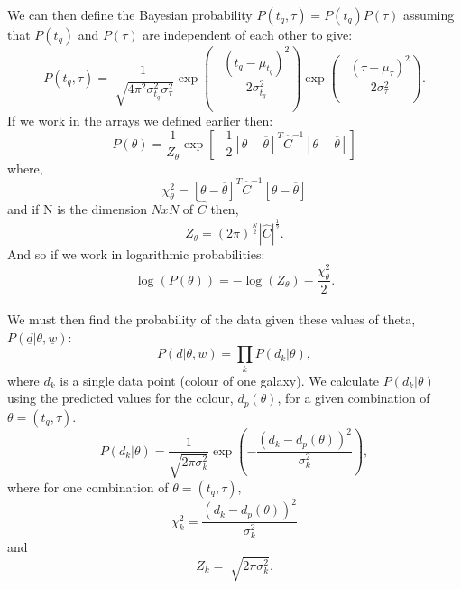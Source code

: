 \documentclass[a4paper, twoside, 12pt]{article}
\begin{document}
We can then define the Bayesian probability $P(t_{q}, \tau) = P(t_{q})P(\tau)$ assuming that $ P(t_{q})$ and $P(\tau)$ are independent of each other to give:
\begin{equation*}
P(t_{q}, \tau) = \frac{1}{\sqrt[]{4\pi^2\sigma^2_{t_{q}}\sigma^2_{\tau}}} \exp\left(-\frac{(t_{q}-\mu_{t_{q}})^2}{2\sigma^2_{t_{q}}}\right)\exp\left(-\frac{(\tau-\mu_{\tau})^2}{2\sigma^2_{\tau}}\right).
\end{equation*}
If we work in the arrays we defined earlier then:
\begin{equation*}
P(\theta) = \frac{1}{Z_{\theta}} \exp{\left[ -\frac{1}{2} [\theta - \overline{\theta}]^T \hat{C}^{-1} [\theta - \overline{\theta}] \right]}
\end{equation*}
where,
\begin{equation*}
\chi^2_{\theta} = [\theta - \overline{\theta}]^T \hat{C}^{-1} [\theta - \overline{\theta}]
\end{equation*}
and if N is the dimension $N x N$ of $\hat{C}$ then,
\begin{equation*}
Z_{\theta} = (2\pi)^{\frac{N}{2}} |\hat{C}|^{\frac{1}{2}}.
\end{equation*}
And so if we work in logarithmic probabilities:
\begin{equation*}
\log{(P(\theta))} = - \log{(Z_{\theta})} - \frac{\chi^2_{\theta}}{2}.
\end{equation*}
\\
We must then find the probability of the data given these values of theta, $P(\underline{d}|\theta, \underline{w})$:
\begin{equation*}
P(\underline{d}|\theta, \underline{w}) = \prod_{k} P(d_{k}|\theta),
\end{equation*}
where $d_{k}$ is a single data point (colour of one galaxy). We calculate $P(d_{k}|\theta)$ using the predicted values for the colour, $d_p(\theta)$, for a given combination of $\theta = (t_{q}, \tau)$. 
\begin{equation*}
P(d_{k}|\theta) = \frac{1}{\sqrt{2\pi\sigma_{k}^2}} \exp{\left( - \frac{(d_{k} - d_{p}(\theta))^2}{\sigma_{k}^2} \right)},
\end{equation*}
where for one combination of $\theta = (t_{q}, \tau)$,
\begin{equation*}
\chi_{k}^2 = \frac{(d_{k} - d_{p}(\theta))^2}{\sigma_{k}^2}
\end{equation*}
and
\begin{equation*}
Z_{k} = \sqrt[]{2\pi\sigma_{k}^2}.
\end{equation*}
\end{document}
